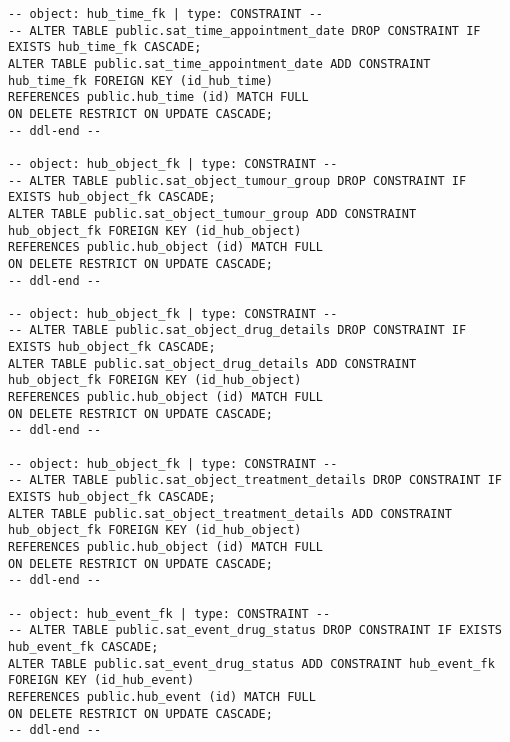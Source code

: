 \begin{lstlisting}
-- object: hub_time_fk | type: CONSTRAINT --
-- ALTER TABLE public.sat_time_appointment_date DROP CONSTRAINT IF EXISTS hub_time_fk CASCADE;
ALTER TABLE public.sat_time_appointment_date ADD CONSTRAINT hub_time_fk FOREIGN KEY (id_hub_time)
REFERENCES public.hub_time (id) MATCH FULL
ON DELETE RESTRICT ON UPDATE CASCADE;
-- ddl-end --

-- object: hub_object_fk | type: CONSTRAINT --
-- ALTER TABLE public.sat_object_tumour_group DROP CONSTRAINT IF EXISTS hub_object_fk CASCADE;
ALTER TABLE public.sat_object_tumour_group ADD CONSTRAINT hub_object_fk FOREIGN KEY (id_hub_object)
REFERENCES public.hub_object (id) MATCH FULL
ON DELETE RESTRICT ON UPDATE CASCADE;
-- ddl-end --

-- object: hub_object_fk | type: CONSTRAINT --
-- ALTER TABLE public.sat_object_drug_details DROP CONSTRAINT IF EXISTS hub_object_fk CASCADE;
ALTER TABLE public.sat_object_drug_details ADD CONSTRAINT hub_object_fk FOREIGN KEY (id_hub_object)
REFERENCES public.hub_object (id) MATCH FULL
ON DELETE RESTRICT ON UPDATE CASCADE;
-- ddl-end --

-- object: hub_object_fk | type: CONSTRAINT --
-- ALTER TABLE public.sat_object_treatment_details DROP CONSTRAINT IF EXISTS hub_object_fk CASCADE;
ALTER TABLE public.sat_object_treatment_details ADD CONSTRAINT hub_object_fk FOREIGN KEY (id_hub_object)
REFERENCES public.hub_object (id) MATCH FULL
ON DELETE RESTRICT ON UPDATE CASCADE;
-- ddl-end --

-- object: hub_event_fk | type: CONSTRAINT --
-- ALTER TABLE public.sat_event_drug_status DROP CONSTRAINT IF EXISTS hub_event_fk CASCADE;
ALTER TABLE public.sat_event_drug_status ADD CONSTRAINT hub_event_fk FOREIGN KEY (id_hub_event)
REFERENCES public.hub_event (id) MATCH FULL
ON DELETE RESTRICT ON UPDATE CASCADE;
-- ddl-end --

\end{lstlisting}
